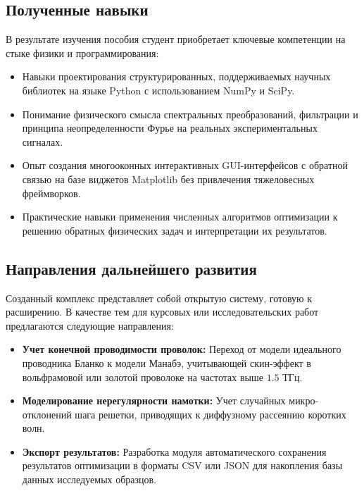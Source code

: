 \subsection*{Полученные навыки}
В результате изучения пособия студент приобретает ключевые компетенции на стыке физики и программирования:
\begin{itemize}
    \item Навыки проектирования структурированных, поддерживаемых научных библиотек на языке Python с использованием NumPy и SciPy.
    \item Понимание физического смысла спектральных преобразований, фильтрации и принципа неопределенности Фурье на реальных экспериментальных сигналах.
    \item Опыт создания многооконных интерактивных GUI-интерфейсов с обратной связью на базе виджетов Matplotlib без привлечения тяжеловесных фреймворков.
    \item Практические навыки применения численных алгоритмов оптимизации к решению обратных физических задач и интерпретации их результатов.
\end{itemize}

\subsection*{Направления дальнейшего развития}
Созданный комплекс представляет собой открытую систему, готовую к расширению. В качестве тем для курсовых или исследовательских работ предлагаются следующие направления:
\begin{itemize}
    \item \textbf{Учет конечной проводимости проволок:} Переход от модели идеального проводника Бланко к модели Манабэ, учитывающей скин-эффект в вольфрамовой или золотой проволоке на частотах выше $1.5$ ТГц.
    \item \textbf{Моделирование нерегулярности намотки:} Учет случайных микро-отклонений шага решетки, приводящих к диффузному рассеянию коротких волн.
    \item \textbf{Экспорт результатов:} Разработка модуля автоматического сохранения результатов оптимизации в форматы CSV или JSON для накопления базы данных исследуемых образцов.
\end{itemize}

